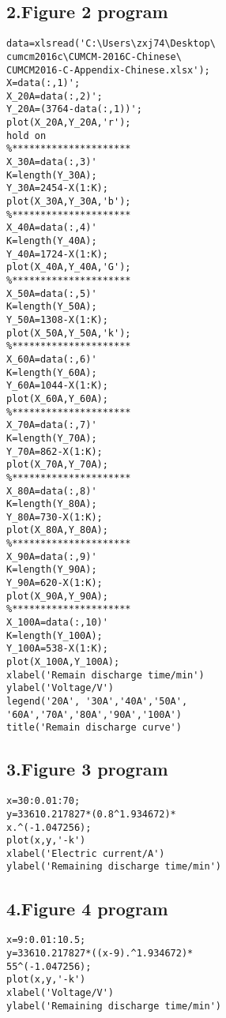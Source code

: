 \documentclass[conference]{IEEEtran}
\begin{document}
\subsection*{2.Figure 2 program}
\begin{lstlisting}
data=xlsread('C:\Users\zxj74\Desktop\
cumcm2016c\CUMCM-2016C-Chinese\
CUMCM2016-C-Appendix-Chinese.xlsx');
X=data(:,1)';
X_20A=data(:,2)';
Y_20A=(3764-data(:,1))';
plot(X_20A,Y_20A,'r');
hold on
%*********************
X_30A=data(:,3)'
K=length(Y_30A);
Y_30A=2454-X(1:K);
plot(X_30A,Y_30A,'b');
%*********************
X_40A=data(:,4)'
K=length(Y_40A);
Y_40A=1724-X(1:K);
plot(X_40A,Y_40A,'G');
%*********************
X_50A=data(:,5)'
K=length(Y_50A);
Y_50A=1308-X(1:K);
plot(X_50A,Y_50A,'k');
%*********************
X_60A=data(:,6)'
K=length(Y_60A);
Y_60A=1044-X(1:K);
plot(X_60A,Y_60A);
%*********************
X_70A=data(:,7)'
K=length(Y_70A);
Y_70A=862-X(1:K);
plot(X_70A,Y_70A);
%*********************
X_80A=data(:,8)'
K=length(Y_80A);
Y_80A=730-X(1:K);
plot(X_80A,Y_80A);
%*********************
X_90A=data(:,9)'
K=length(Y_90A);
Y_90A=620-X(1:K);
plot(X_90A,Y_90A);
%*********************
X_100A=data(:,10)'
K=length(Y_100A);
Y_100A=538-X(1:K);
plot(X_100A,Y_100A);
xlabel('Remain discharge time/min')
ylabel('Voltage/V')
legend('20A', '30A','40A','50A',
'60A','70A','80A','90A','100A')
title('Remain discharge curve')
\end{lstlisting}

\subsection*{3.Figure 3 program}
\begin{lstlisting}
x=30:0.01:70;
y=33610.217827*(0.8^1.934672)*
x.^(-1.047256);
plot(x,y,'-k')
xlabel('Electric current/A')
ylabel('Remaining discharge time/min')

\end{lstlisting}
\subsection*{4.Figure 4 program}
\begin{lstlisting}
x=9:0.01:10.5;
y=33610.217827*((x-9).^1.934672)*
55^(-1.047256);
plot(x,y,'-k')
xlabel('Voltage/V')
ylabel('Remaining discharge time/min')
\end{lstlisting}
\end{document}
